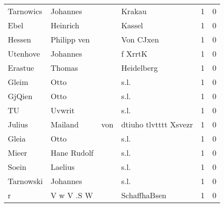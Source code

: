 \begin{tabular}{llllrr}
                Tarnowics &                           Johannes &             &                                      Krakau &          1 &         0 \\
                     Ebel &                           Heinrich &             &                                      Kassel &          1 &         0 \\
                   Hessen &                        Philipp ven &             &                                   Von CJxen &          1 &         0 \\
                 Utenhove &                           Johannes &             &                                     f XrrtK &          1 &         0 \\
                  Erastue &                             Thomas &             &                                  Heidelberg &          1 &         0 \\
                    Gleim &                               Otto &             &                                        s.l. &          1 &         0 \\
                   GjQien &                               Otto &             &                                        s.l. &          1 &         0 \\
                       TU &                             Uvwrit &             &                                        s.l. &          1 &         0 \\
                   Julius &                            Mailand &         von &                       dtiuho tlvtttt Xsvezr &          1 &         0 \\
                    Gleia &                               Otto &             &                                        s.l. &          1 &         0 \\
                    Mieer &                        Hane Rudolf &             &                                        s.l. &          1 &         0 \\
                    Soein &                            Laelius &             &                                        s.l. &          1 &         0 \\
                Tarnowski &                           Johannes &             &                                        s.l. &          1 &         0 \\
                        r &                         V w V .S W &             &                                SchaffhaBsen &          1 &         0 \\

\end{tabular}
